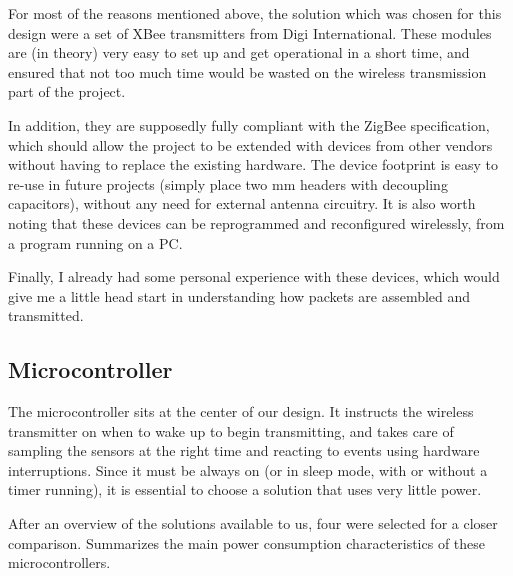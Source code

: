 For most of the reasons mentioned above, the solution which was chosen for this
design were a set of XBee transmitters from Digi
International. These modules are (in theory) very easy to
set up and get operational in a short time, and ensured that not too much time
would be wasted on the wireless transmission part of the project.

In addition, they are supposedly fully compliant with the
ZigBee specification, which should allow the project to
be extended with devices from other vendors without having to replace the
existing hardware. The device footprint is easy to re-use in future projects
(simply place two \unit[2]{mm} headers with decoupling capacitors), without any
need for external antenna circuitry. It is also worth noting that these devices
can be reprogrammed and reconfigured wirelessly, from a program running on a PC.

Finally, I already had some personal experience with these devices, which would
give me a little head start in understanding how packets are assembled and
transmitted.



\subsection{Microcontroller}
\label{sub:microcontroller}
The microcontroller sits at the center of our design. It instructs the wireless
transmitter on when to wake up to begin transmitting, and takes care of sampling
the sensors at the right time and reacting to events using hardware
interruptions. Since it must be always on (or in sleep mode, with or without a
timer running), it is essential to choose a solution that uses very little
power.

After an overview of the solutions available to us, four were selected for a
closer comparison.  Summarizes the main power
consumption characteristics of these microcontrollers.

